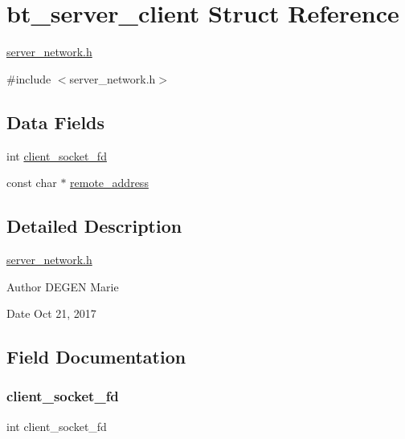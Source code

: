 \hypertarget{structbt__server__client}{}\section{bt\+\_\+server\+\_\+client Struct Reference}
\label{structbt__server__client}


\hyperlink{server__network_8h}{server\+\_\+network.\+h}  




{\ttfamily \#include $<$server\+\_\+network.\+h$>$}

\subsection*{Data Fields}
\begin{DoxyCompactItemize}
\item 
int \hyperlink{structbt__server__client_acdd1f9ce5cfb6c148331b6d3ce2c841c}{client\+\_\+socket\+\_\+fd}
\item 
const char $\ast$ \hyperlink{structbt__server__client_a74df07aa1669bf94640440544efbd71c}{remote\+\_\+address}
\end{DoxyCompactItemize}


\subsection{Detailed Description}
\hyperlink{server__network_8h}{server\+\_\+network.\+h} 

\begin{DoxyAuthor}{Author}
D\+E\+G\+EN Marie 
\end{DoxyAuthor}
\begin{DoxyDate}{Date}
Oct 21, 2017 
\end{DoxyDate}


\subsection{Field Documentation}
\mbox{\label{structbt__server__client_acdd1f9ce5cfb6c148331b6d3ce2c841c}} 
\subsubsection{\texorpdfstring{client\+\_\+socket\+\_\+fd}{client\_socket\_fd}}
{\footnotesize\ttfamily int client\+\_\+socket\+\_\+fd}

